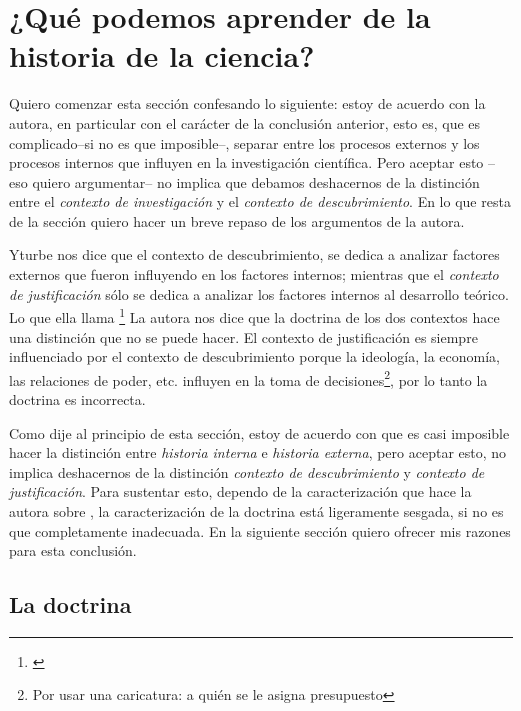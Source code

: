 \section{¿Qué podemos aprender de la historia de la ciencia?}


\noindent Quiero comenzar esta sección confesando lo siguiente: estoy de acuerdo con la autora, en particular con el carácter de la conclusión anterior, esto es, que es complicado--si no es que imposible--, separar entre los procesos externos y los procesos internos que influyen en la investigación científica.
Pero aceptar esto --eso quiero argumentar-- no implica que debamos deshacernos de la distinción entre el \emph{contexto de investigación} y el \emph{contexto de descubrimiento}.
En lo que resta de la sección quiero hacer un breve repaso de los argumentos de la autora.

Yturbe nos dice que el contexto de descubrimiento, se dedica a analizar factores externos que fueron influyendo en los factores internos; mientras que el \emph{contexto de justificación} sólo se dedica a analizar los factores internos al desarrollo teórico.
Lo que ella llama \footnote{
	 \cite[p. 75]{Yturbe1995}
}
La autora nos dice que la doctrina de los dos contextos hace una distinción que no se puede hacer.
El contexto de justificación es siempre influenciado por el contexto de descubrimiento porque la ideología, la economía, las relaciones de poder, etc. influyen en la toma de decisiones\footnote{Por usar una caricatura: a quién se le asigna presupuesto}, por lo tanto la doctrina es incorrecta.

Como dije al principio de esta sección, estoy de acuerdo con que es casi imposible hacer la distinción entre \emph{historia interna} e \emph{historia externa}, pero aceptar esto, no implica deshacernos de la distinción \emph{contexto de descubrimiento} y \emph{contexto de justificación}.
Para sustentar esto, dependo de la caracterización que hace la autora sobre , la caracterización de la doctrina está ligeramente sesgada, si no es que completamente inadecuada.
En la siguiente sección quiero ofrecer mis razones para esta conclusión.

\subsection{La doctrina}

